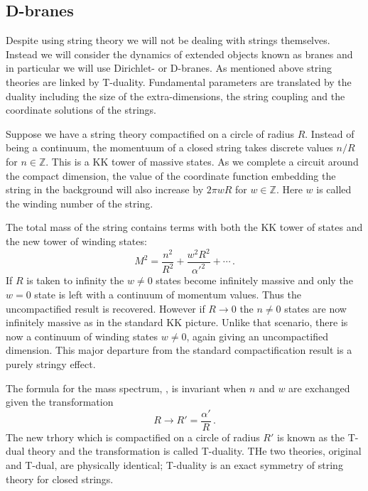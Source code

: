 \subsection{D-branes}
% 
% 
% 
% 
% 
Despite using string theory we will not be dealing with strings themselves.
Instead we will consider the dynamics of extended objects known as branes and
in particular we will use Dirichlet- or D-branes. As mentioned above string
theories are linked by T-duality. Fundamental parameters are translated by the
duality including the size of the extra-dimensions, the string coupling and the
coordinate solutions of the strings.

Suppose we have a string theory compactified on a circle of radius $R$. Instead
of being a continuum, the momentuum of a closed string takes discrete values
$n/R$ for $n \in \mathbb{Z}$. This is a KK tower of massive states. As we
complete a circuit around the compact dimension, the value of the coordinate
function embedding the string in the background will also increase by $2\pi w
R$ for $w \in \mathbb{Z}$. Here $w$ is called the winding number of the string.

The total mass of the string contains terms with both the KK tower of states
and the new tower of winding states:
\begin{equation}
\label{eq:closedmass-dbiintro}
 M^2 = \frac{n^2}{R^2} + \frac{w^2 R^2}{\alpha'^2} + \cdots\,.
\end{equation}
If $R$ is taken to infinity the $w\ne 0$ states become infinitely massive and
only the $w=0$ state is left with a continuum of momentum values. Thus the
uncompactified result is recovered. However if $R\rightarrow0$ the $n\ne 0$
states are now infinitely massive as in the standard KK picture. Unlike that
scenario, there is now a continuum of winding states $w\ne 0$, again giving an
uncompactified dimension. This major departure from the standard
compactification result is a purely stringy effect. 

The formula for the mass spectrum, , is invariant
when $n$ and $w$ are exchanged given the transformation
\begin{equation}
 R \rightarrow R' = \frac{\alpha'}{R}\,.
\end{equation}
The new trhory which is compactified on a circle of radius $R'$ is known as the
T-dual theory and the transformation is called T-duality. THe two theories,
original and T-dual, are physically identical; T-duality is an exact symmetry
of string theory for closed strings.





